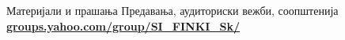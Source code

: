 \begin{frame}{Материјали и прашања}{}
    Предавања, аудиториски вежби, соопштенија\\
    \href{http://groups.yahoo.com/group/SI\_FINKI\_Sk/}{\textbf{groups.yahoo.com/group/SI\_FINKI\_Sk/}}
    \vfill
\end{frame}